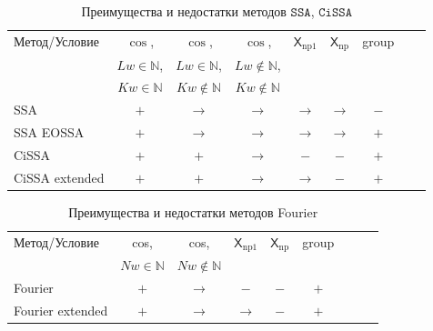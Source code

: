 \documentclass[12pt, specialist, subf
]{disser}
\theoremstyle{definition}
\newcommand{\SSA}{\texttt{SSA}}
\newcommand{\CISSA}{\texttt{CiSSA}}
\newcommand{\TS}{\mathsf{X}}
\begin{document}
\begin{table}[H]
	\caption{Преимущества и недостатки методов $\SSA$, $\CISSA$}
	\centering
	\begin{center}
		\begin{tabular}{l|cccccccc}
			\hline
			Метод/Условие  & $\cos$,             & $\cos$,                & $\cos$,                 & $\TS_{\mathrm{np1}}$ & $\TS_{\mathrm{np}}$ & group \\
			               & $Lw \in \mathbb N$, & $Lw\in \mathbb N$,     & $Lw \not\in \mathbb N$, &                                                    \\
			               & $Kw\in \mathbb N$   & $Kw \not\in \mathbb N$ & $Kw \not\in \mathbb N$  &                                                    \\
			\hline
			SSA            & $+$                 & $\to$                  & $\to$                   & $\to$                & $\to$               & $-$   \\
			SSA EOSSA      & $+$                 & $\to$                  & $\to$                   & $\to$                & $\to$               & $+$   \\
			CiSSA          & $+$                 & $+$                    & $\to$                   & $-$                  & $-$                 & $+$   \\
			CiSSA extended & $+$                 & $+$                    & $\to$                   & $\to$                & $-$                 & $+$   \\
			\hline
		\end{tabular}
	\end{center}
	\label{tab:advantages_ssa_cissa}
\end{table}

\begin{table}[H]
	\caption{Преимущества и недостатки методов Fourier}
	\centering
	\begin{center}
		\begin{tabular}{l|cccccccc}
			\hline
			Метод/Условие    & cos,               & cos,                    & $\TS_{\mathrm{np1}}$ & $\TS_{\mathrm{np}}$ & group \\
			                 & $Nw \in \mathbb N$ & $Nw \not \in \mathbb N$                                                      \\
			\hline
			Fourier          & $+$                & $\to$                   & $-$                  & $-$                 & $+$   \\
			Fourier extended & $+$                & $\to$                   & $\to$                & $-$                 & $+$   \\
			\hline
		\end{tabular}
	\end{center}
	\label{tab:advantages_fourier}
\end{table}
\end{document}
